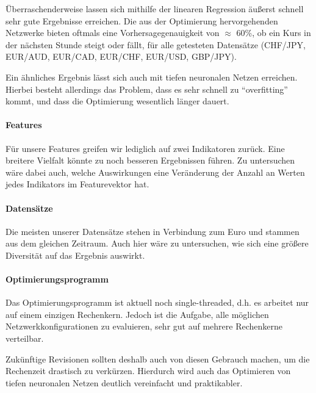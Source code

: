 Überraschenderweise lassen sich mithilfe der linearen Regression äußerst schnell sehr gute Ergebnisse erreichen. Die aus der Optimierung hervorgehenden Netzwerke bieten oftmals eine Vorhersagegenauigkeit von $\approx$ 60\%, ob ein Kurs in der nächsten Stunde steigt oder fällt, für alle getesteten Datensätze (CHF/JPY, EUR/AUD, EUR/CAD, EUR/CHF, EUR/USD, GBP/JPY).

Ein ähnliches Ergebnis lässt sich auch mit tiefen neuronalen Netzen erreichen. Hierbei besteht allerdings das Problem, dass es sehr schnell zu \enquote{overfitting} kommt, und dass die Optimierung wesentlich länger dauert.

\paragraph{Features}
Für unsere Features greifen wir lediglich auf zwei Indikatoren zurück. Eine breitere Vielfalt könnte zu noch besseren Ergebnissen führen. Zu untersuchen wäre dabei auch, welche Auswirkungen eine Veränderung der Anzahl an Werten jedes Indikators im Featurevektor hat.

\paragraph{Datensätze}
Die meisten unserer Datensätze stehen in Verbindung zum Euro und stammen aus dem gleichen Zeitraum. Auch hier wäre zu untersuchen, wie sich eine größere Diversität auf das Ergebnis auswirkt.

\paragraph{Optimierungsprogramm}
Das Optimierungsprogramm ist aktuell noch single-threaded, d.h. es arbeitet nur auf einem einzigen Rechenkern. Jedoch ist die Aufgabe, alle möglichen Netzwerkkonfigurationen zu evaluieren, sehr gut auf mehrere Rechenkerne verteilbar. 

Zukünftige Revisionen sollten deshalb auch von diesen Gebrauch machen, um die Rechenzeit drastisch zu verkürzen. Hierdurch wird auch das Optimieren von tiefen neuronalen Netzen deutlich vereinfacht und praktikabler.

